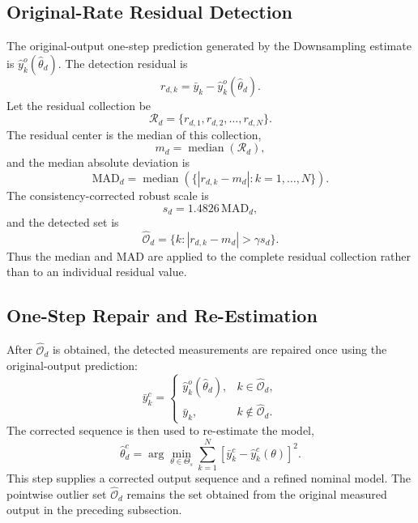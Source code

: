 \documentclass[journal]{IEEEtran}
\newcommand{\med}{\operatorname{median}}
\newcommand{\Oh}{\widehat{\mathcal O}}
\begin{document}
\subsection{Original-Rate Residual Detection}
The original-output one-step prediction generated by the Downsampling estimate is $\hat y_k^{o}(\hat\theta_d)$. The detection residual is
\begin{equation}
r_{d,k}=\bar y_k-\hat y_k^{o}(\hat\theta_d).
\end{equation}
Let the residual collection be
\begin{equation}
\mathcal R_d=\{r_{d,1},r_{d,2},\ldots,r_{d,N}\}.
\end{equation}
The residual center is the median of this collection,
\begin{equation}
m_d=\med(\mathcal R_d),
\end{equation}
and the median absolute deviation is
\begin{equation}
\mathrm{MAD}_d=\med\left(\{|r_{d,k}-m_d|:k=1,\ldots,N\}\right).
\end{equation}
The consistency-corrected robust scale is
\begin{equation}
s_d=1.4826\,\mathrm{MAD}_d,
\end{equation}
and the detected set is
\begin{equation}
\Oh_d=\{k:|r_{d,k}-m_d|>\gamma s_d\}.
\end{equation}
Thus the median and MAD are applied to the complete residual collection rather than to an individual residual value.

\subsection{One-Step Repair and Re-Estimation}
After $\Oh_d$ is obtained, the detected measurements are repaired once using the original-output prediction:
\begin{equation}
\bar y_k^{c}=\begin{cases}
\hat y_k^{o}(\hat\theta_d),&k\in\Oh_d,\\
\bar y_k,&k\notin\Oh_d.
\end{cases}
\end{equation}
The corrected sequence is then used to re-estimate the model,
\begin{equation}
\hat\theta_d^{c}=\arg\min_{\theta\in\Theta_s}
\sum_{k=1}^{N}\left[\bar y_k^{c}-\hat y_k^{c}(\theta)\right]^2.
\end{equation}
This step supplies a corrected output sequence and a refined nominal model. The pointwise outlier set $\Oh_d$ remains the set obtained from the original measured output in the preceding subsection.
\end{document}

